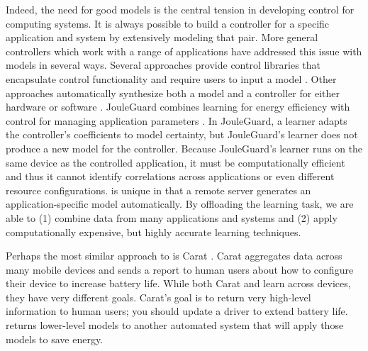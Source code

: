 Indeed, the need for good models is the central tension in developing
control for computing systems.  It is always possible to build a
controller for a specific application and system by extensively
modeling that pair.  More general controllers which work with a range
of applications have addressed this issue with models in several ways.
Several approaches provide control libraries that encapsulate control
functionality and require users to input a model
\cite{ControlWare,Sojka,Rajkumar,POET}.  Other approaches
automatically synthesize both a model and a controller for either
hardware \cite{josep-isca2016} or software \cite{ICSE2014,FSE2015}.
JouleGuard combines learning for energy efficiency with control for
managing application parameters \cite{JouleGuard}.  In JouleGuard, a
learner adapts the controller's coefficients to model certainty, but
JouleGuard's learner does not produce a new model for the controller.
Because JouleGuard's learner runs on the same device as the controlled
application, it must be computationally efficient and thus it cannot
identify correlations across applications or even different resource
configurations.  \SYSTEM{} is unique in that a remote server generates
an application-specific model automatically.  By offloading the
learning task, we are able to (1) combine data from many applications
and systems and (2) apply computationally expensive, but highly accurate
learning techniques.

Perhaps the most similar approach to \SYSTEM{} is Carat \cite{carat}.
Carat aggregates data across many mobile devices and sends a report to
human users about how to configure their device to increase battery
life.  While both Carat and \SYSTEM{} learn across devices, they have
very different goals.  Carat's goal is to return very high-level
information to human users; \eg you should update a driver to extend
battery life.  \SYSTEM{} returns lower-level models to another
automated system that will apply those models to save energy.


